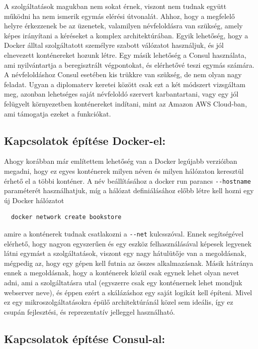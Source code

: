 \documentclass[11pt,magyar,a4paper,twoside,]{report}
\begin{document}
A szolgáltatások magukban nem sokat érnek, viszont nem tudnak együtt
működni ha nem ismerik egymás elérési útvonalát. Ahhoz, hogy a megfelelő
helyre érkezzenek be az üzenetek, valamilyen névfeloldásra van szükség,
amely képes irányítani a kéréseket a komplex architektúrában. Egyik
lehetőség, hogy a Docker álltal szolgáltatott személyre szabott
válózatot használjuk, és jól elnevezett konténereket hozunk létre. Egy
másik lehetőség a Consul használata, ami nyilvántartja a beregisztrált
végpontokat, és elérhetővé teszi egymás számára. A névfeloldáshoz Consul
esetében kis trükkre van szükség, de nem olyan nagy feladat. Ugyan a
diplomaterv keretei között csak ezt a két módszert vizsgáltam meg,
azonban lehetséges saját névfeloldó szervert karbantartani, vagy egy jól
felügyelt környezetben konténereket indítani, mint az Amazon AWS
Cloud-ban, ami támogatja ezeket a funkciókat.

\subsection{Kapcsolatok építése
Docker-el:}\label{kapcsolatok-uxe9puxedtuxe9se-docker-el}

Ahogy korábban már említettem lehetőség van a Docker legújabb verzióiban
megadni, hogy ez egyes konténerek milyen néven és milyen hálózaton
keresztül érhető el a többi konténer. A név beállításához a docker run
parancs \texttt{-\/-hostname} paraméterét használhatjuk, míg a hálózat
definiálásához előbb létre kell hozni egy új Docker hálózatot

\begin{verbatim}
  docker network create bookstore
\end{verbatim}

amire a konténerek tudnak csatlakozni a \texttt{-\/-net} kulcsszóval.
Ennek segítségével elérhető, hogy nagyon egyszerűen és egy eszköz
felhasználásával képesek legyenek látni egymást a szolgáltatások,
viszont egy nagy hátulütője van a megoldásnak, mégpedig az, hogy egy
gépen kell futnia az összes alkalmazásnak. Másik hátránya ennek a
megoldásnak, hogy a konténerek közül csak egynek lehet olyan nevet adni,
ami a szolgáltatásra utal (egyszerre csak egy konténernek lehet mondjuk
webserver neve), és éppen ezért a skálázáshoz egy saját logikát kell
építeni. Mivel ez egy mikroszolgáltatásokra épülő architektúránál közel
sem ideális, így ez csupán fejlesztési, és reprezentatív jelleggel
használható.

\subsection{Kapcsolatok építése
Consul-al:}\label{kapcsolatok-uxe9puxedtuxe9se-consul-al}
\end{document}
